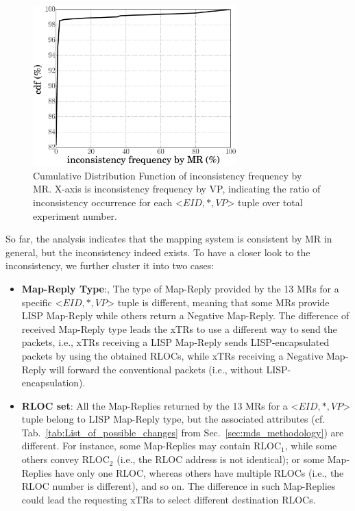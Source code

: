 \begin{figure}[!t] 
	\centering
	\includegraphics[width=0.7\textwidth]{Pics/cdf_incons_occur_MR.eps}
	\caption{Cumulative Distribution Function of inconsistency frequency by MR. X-axis is inconsistency frequency by VP, indicating the ratio of inconsistency occurrence for each <$EID, *, VP$> tuple over total experiment number.}
	\label{fig:cdf_incons_occur_MR}
\end{figure}

So far, the analysis indicates that the mapping system is consistent by MR in general, but the inconsistency indeed exists. To have a closer look to the inconsistency, we further cluster it into two cases:
\begin{itemize}[noitemsep,topsep=0pt]

\item \textbf{Map-Reply Type}:, The type of Map-Reply provided by the 13 MRs for a specific <$EID, *, VP$> tuple is different, meaning that some MRs provide LISP Map-Reply while others return a Negative Map-Reply. The difference of received Map-Reply type leads the xTRs to use a different way to send the packets, i.e., xTRs receiving a LISP Map-Reply sends LISP-encapsulated packets by using the obtained RLOCs, while xTRs receiving a Negative Map-Reply will forward the conventional packets (i.e., without LISP-encapsulation).
\item \textbf{RLOC set}: All the Map-Replies returned by the 13 MRs for a <$EID, *, VP$> tuple belong to LISP Map-Reply type, but the associated attributes (cf.  Tab.~\ref{tab:List_of_possible_changes} from Sec.~\ref{sec:mds_methodology}) are different.  For instance, some Map-Replies may contain RLOC$_1$, while some others convey RLOC$_2$ (i.e., the RLOC address is not identical); or some Map-Replies have only one RLOC, whereas others have multiple RLOCs (i.e., the RLOC number is different), and so on. The difference in such Map-Replies could lead the requesting xTRs to select different destination RLOCs. 
\end{itemize}

